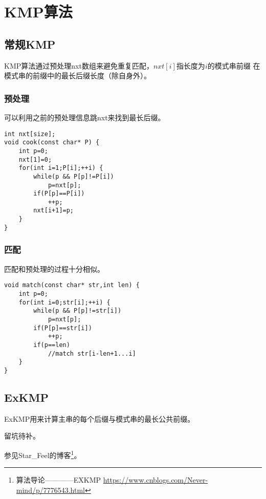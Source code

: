 \section{KMP算法}
\subsection{常规KMP}
KMP算法通过预处理nxt数组来避免重复匹配，$nxt[i]$指长度为$i$的模式串前缀
在模式串的前缀中的最长后缀长度（除自身外）。
\subsubsection{预处理}
可以利用之前的预处理信息跳nxt来找到最长后缀。
\begin{lstlisting}
int nxt[size];
void cook(const char* P) {
    int p=0;
    nxt[1]=0;
    for(int i=1;P[i];++i) {
        while(p && P[p]!=P[i])
            p=nxt[p];
        if(P[p]==P[i])
            ++p;
        nxt[i+1]=p;
    }
}
\end{lstlisting}
\subsubsection{匹配}
匹配和预处理的过程十分相似。
\begin{lstlisting}
void match(const char* str,int len) {
    int p=0;
    for(int i=0;str[i];++i) {
        while(p && P[p]!=str[i])
            p=nxt[p];
        if(P[p]==str[i])
            ++p;
        if(p==len)
            //match str[i-len+1...i]
    }
}
\end{lstlisting}
\subsection{ExKMP}
ExKMP用来计算主串的每个后缀与模式串的最长公共前缀。

留坑待补。

参见Star\_Feel的博客\footnote{算法导论————EXKMP
    \url{https://www.cnblogs.com/Never-mind/p/7776543.html}
}。

